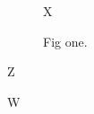 \documentclass{article}
\begin{document}
\begin{figure}[h]X\caption{Fig one.}\end{figure}
\begin{listing}[h]Z\caption{Code one.}\end{listing}
\begin{program}[h]W\caption{Prog one.}\end{program}
\end{document}
